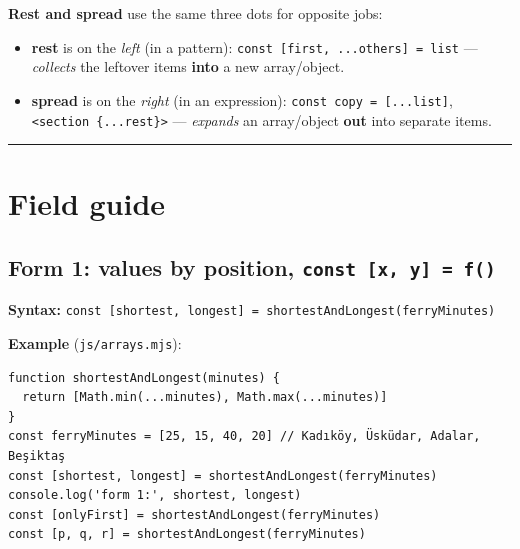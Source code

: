 \documentclass[
  10pt,
]{article}
\providecommand{\tightlist}{%
  \setlength{\itemsep}{0pt}\setlength{\parskip}{0pt}}
\begin{document}
\textbf{Rest and spread} use the same three dots for opposite jobs:

\begin{itemize}
\tightlist
\item
  \textbf{rest} is on the \emph{left} (in a pattern):
  \texttt{const\ {[}first,\ .\allowbreak{}.\allowbreak{}.\allowbreak{}others{]\allowbreak{}}\ =\ list}
  --- \emph{collects} the leftover items \textbf{into} a new
  array/object.
\item
  \textbf{spread} is on the \emph{right} (in an expression):
  \texttt{const\ copy\ =\ {[}.\allowbreak{}.\allowbreak{}.\allowbreak{}list{]\allowbreak{}}},
  \texttt{\textless{}\allowbreak{}section\ \{.\allowbreak{}.\allowbreak{}.\allowbreak{}rest\}\textgreater{}\allowbreak{}}
  --- \emph{expands} an array/object \textbf{out} into separate items.
\end{itemize}

\begin{center}\rule{0.5\linewidth}{0.5pt}\end{center}

\hypertarget{field-guide}{%
\section{Field guide}\label{field-guide}}

\hypertarget{form-1-values-by-position-const-x-y--f}{%
\subsection{\texorpdfstring{Form 1: values by position,
\texttt{const\ {[}x,\ y{]\allowbreak{}}\ =\ f()}}{Form 1: values by position, }}\label{form-1-values-by-position-const-x-y--f}}

\textbf{Syntax:}
\texttt{const\ {[}shortest,\ longest{]\allowbreak{}}\ =\ shortestAndLongest(ferryMinutes)}

\textbf{Example} (\texttt{js/\allowbreak{}arrays.\allowbreak{}mjs}):

\begin{verbatim}
function shortestAndLongest(minutes) {
  return [Math.min(...minutes), Math.max(...minutes)]
}
const ferryMinutes = [25, 15, 40, 20] // Kadıköy, Üsküdar, Adalar, Beşiktaş
const [shortest, longest] = shortestAndLongest(ferryMinutes)
console.log('form 1:', shortest, longest)
const [onlyFirst] = shortestAndLongest(ferryMinutes)
const [p, q, r] = shortestAndLongest(ferryMinutes)
\end{verbatim}
\end{document}
